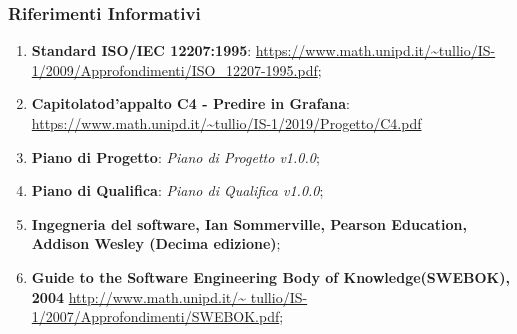 \subsubsection{Riferimenti Informativi}
\begin{enumerate}
	\item \textbf{Standard ISO/IEC 12207:1995}: 
	\url{https://www.math.unipd.it/~tullio/IS-1/2009/Approfondimenti/ISO_12207-1995.pdf};
	\item \textbf{Capitolato\glosp d'appalto C4 - Predire in Grafana}:  \url{https://www.math.unipd.it/~tullio/IS-1/2019/Progetto/C4.pdf}
	\item \textbf{Piano di Progetto}: \textit{Piano di Progetto v1.0.0};
	\item \textbf{Piano di Qualifica}: \textit{Piano di Qualifica v1.0.0};
	\item \textbf{Ingegneria del software, Ian Sommerville, Pearson Education, Addison Wesley (Decima edizione)};
	\item \textbf{Guide to the Software Engineering Body of Knowledge(SWEBOK), 2004}
		\url{http://www.math.unipd.it/~	tullio/IS-1/2007/Approfondimenti/SWEBOK.pdf};

	
	
	
	
	
	
\end{enumerate}


